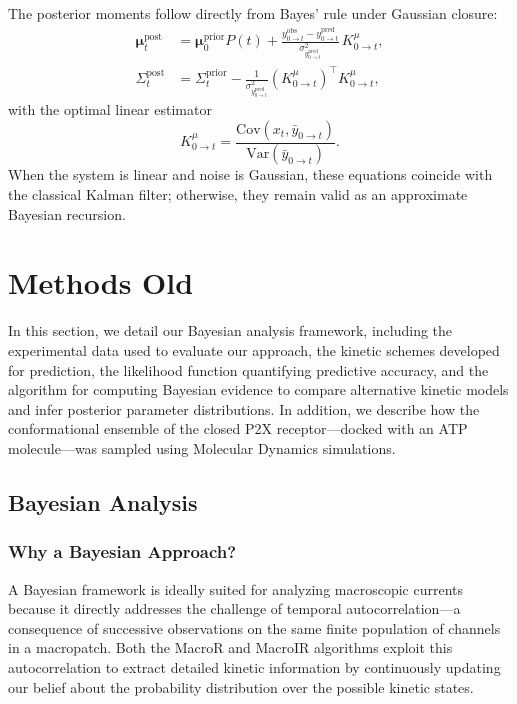 \documentclass[9pt]{elife}
\begin{document}
	The posterior moments follow directly from Bayes’ rule under Gaussian closure:
	\begin{align}
		\bm{\mu}^{\mathrm{post}}_{t} &=
		\bm{\mu}^{\mathrm{prior}}_0 P(t)
		+ \frac{y^{\mathrm{obs}}_{0\to t}-y^{\mathrm{pred}}_{0\to t}}{\sigma^2_{y^{\mathrm{pred}}_{0\to t}}}\,K^\mu_{0\to t},\\
		\Sigma^{\mathrm{post}}_{t} &=
		\Sigma^{\mathrm{prior}}_{t}
		- \frac{1}{\sigma^2_{y^{\mathrm{pred}}_{0\to t}}}
		(K^\mu_{0\to t})^\top K^\mu_{0\to t},
	\end{align}
	with the optimal linear estimator
	\[
	K^\mu_{0\to t} = \frac{\mathrm{Cov}(x_t,\bar y_{0\to t})}{\mathrm{Var}(\bar y_{0\to t})}.
	\]
	When the system is linear and noise is Gaussian, these equations coincide with the classical Kalman filter; otherwise, they remain valid as an approximate Bayesian recursion.
	
	\section*{Methods Old}\label{sec:methods}
	
	In this section, we detail our Bayesian analysis framework, including the experimental data used to evaluate our approach, the kinetic schemes developed for prediction, the likelihood function quantifying predictive accuracy, and the algorithm for computing Bayesian evidence to compare alternative kinetic models and infer posterior parameter distributions. In addition, we describe how the conformational ensemble of the closed P2X receptor—docked with an ATP molecule—was sampled using Molecular Dynamics simulations.
	
	\subsection{Bayesian Analysis}
	\subsubsection{Why a Bayesian Approach?}
	A Bayesian framework is ideally suited for analyzing macroscopic currents because it directly addresses the challenge of temporal autocorrelation—a consequence of successive observations on the same finite population of channels in a macropatch. Both the MacroR and MacroIR algorithms exploit this autocorrelation to extract detailed kinetic information by continuously updating our belief about the probability distribution over the possible kinetic states.
	
\end{document}
